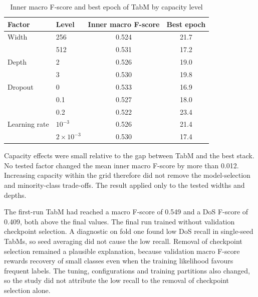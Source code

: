 \documentclass[conference]{IEEEtran}
\begin{document}
\begin{table}[!tb]
    \caption{Inner macro F-score and best epoch of TabM by capacity level}
    \label{tab:capacity}
    \centering\footnotesize
    \begin{tabular}{@{}llcc@{}}
        \toprule
        Factor        & Level              & Inner macro F-score & Best epoch \\
        \midrule
        Width         & 256                & 0.524               & 21.7       \\
                      & 512                & 0.531               & 17.2       \\
        Depth         & 2                  & 0.526               & 19.0       \\
                      & 3                  & 0.530               & 19.8       \\
        Dropout       & 0                  & 0.533               & 16.9       \\
                      & 0.1                & 0.527               & 18.0       \\
                      & 0.2                & 0.522               & 23.4       \\
        Learning rate & $10^{-3}$          & 0.526               & 21.4       \\
                      & $2\times10^{-3}$   & 0.530               & 17.4       \\
        \bottomrule
    \end{tabular}
\end{table}

Capacity effects were small relative to the gap between TabM and the best stack. No tested factor changed the mean inner macro F-score by more than 0.012. Increasing capacity within the grid therefore did not remove the model-selection and minority-class trade-offs. The result applied only to the tested widths and depths.

The first-run TabM had reached a macro F-score of 0.549 and a DoS F-score of 0.409, both above the final values. The final run trained without validation checkpoint selection. A diagnostic on fold one found low DoS recall in single-seed TabMs, so seed averaging did not cause the low recall. Removal of checkpoint selection remained a plausible explanation, because validation macro F-score rewards recovery of small classes even when the training likelihood favours frequent labels. The tuning, configurations and training partitions also changed, so the study did not attribute the low recall to the removal of checkpoint selection alone.
\end{document}
